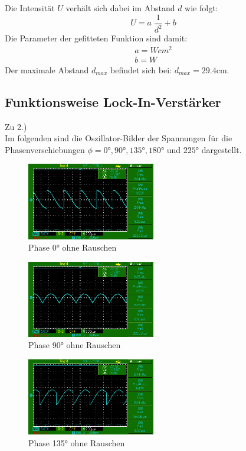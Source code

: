 Die Intensität $U$ verhält sich dabei im Abstand $d$ wie folgt:
\begin{equation*}
    U=a\;\frac{1}{d^2}+b
\end{equation*}
Die Parameter der gefitteten Funktion sind damit:
\begin{align}
    a= Wcm^2\\
    b= W
\end{align}
Der maximale Abstand $d_{max}$ befindet sich bei: $d_{max}=29.4$cm.

\subsection{Funktionsweise Lock-In-Verstärker}
Zu 2.)\\
Im folgenden sind die Oszillator-Bilder der Spannungen für die Phasenverschiebungen $\phi = 0°, 90°, 135°, 180°$ und $225°$ dargestellt.

\begin{figure}
    \centering
    \includegraphics[width=0.5\textwidth]{bilder/MAP001.png}
    \caption{Phase 0° ohne Rauschen}        
    \label{fig:MAP001}
\end{figure}

\begin{figure}
    \centering
    \includegraphics[width=0.5\textwidth]{bilder/MAP002.png}
    \caption{Phase 90° ohne Rauschen}        
    \label{fig:MAP002}
\end{figure}

\begin{figure}
    \centering
    \includegraphics[width=0.5\textwidth]{bilder/MAP005.png}
    \caption{Phase 135° ohne Rauschen}        
    \label{fig:MAP005}
\end{figure}

